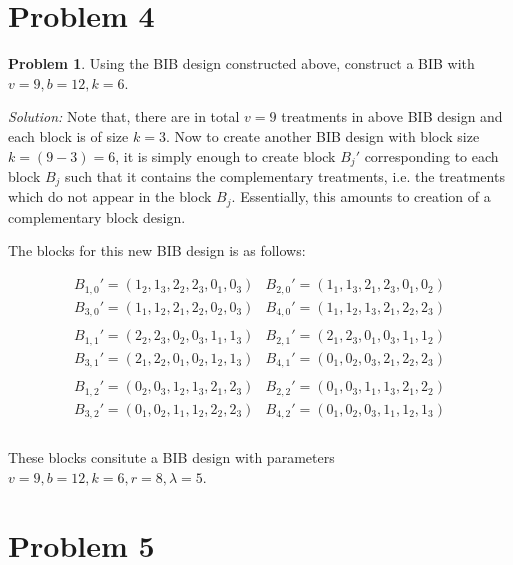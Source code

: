 \documentclass[12pt]{article}
\theoremstyle{definition}
\newtheorem*{prb}{Problem}
\newenvironment{problem}{
\begin{tcolorbox}[colback=blue!5!white,colframe=blue!75!black, parbox = true] \begin{prb}  }{\end{prb}\end{tcolorbox} }
\newenvironment{answer}{\textit{Solution: }\quad }{ \hfill \qedsymbol}
\begin{document}
\section{Problem 4}

\begin{problem}
	Using the BIB design constructed above, construct a BIB with $v = 9, b = 12, k = 6$.
\end{problem}

\begin{answer}
	Note that, there are in total $v = 9$ treatments in above BIB design and each block is of size $k = 3$. Now to create another BIB design with block size $k = (9-3) = 6$, it is simply enough to create block $B_j'$ corresponding to each block $B_j$ such that it contains the complementary treatments, i.e. the treatments which do not appear in the block $B_j$. Essentially, this amounts to creation of a complementary block design.

	The blocks for this new BIB design is as follows:

	$$\begin{array}{llll}
		B_{1,0}' = (1_2, 1_3, 2_2, 2_3, 0_1, 0_3) 
		& B_{2, 0}' = (1_1, 1_3, 2_1, 2_3, 0_1, 0_2)\\
		B_{3,0}' = (1_1, 1_2, 2_1, 2_2, 0_2, 0_3)
		& B_{4, 0}' = (1_1, 1_2, 1_3, 2_1, 2_2, 2_3)\\
		& \\
		B_{1,1}' = (2_2, 2_3, 0_2, 0_3, 1_1, 1_3) 
		& B_{2, 1}' = (2_1, 2_3, 0_1, 0_3, 1_1, 1_2)\\
		B_{3,1}' = (2_1, 2_2, 0_1, 0_2, 1_2, 1_3)
		& B_{4, 1}' = (0_1, 0_2, 0_3, 2_1, 2_2, 2_3)\\
		& \\
		B_{1,2}' = (0_2, 0_3, 1_2, 1_3, 2_1, 2_3) 
		& B_{2, 2}' = (0_1, 0_3, 1_1, 1_3, 2_1, 2_2)\\
		B_{3,2}' = (0_1, 0_2, 1_1, 1_2, 2_2, 2_3)
		& B_{4, 2}' = (0_1, 0_2, 0_3, 1_1, 1_2, 1_3)\\
		& \\
	\end{array}$$

	These blocks consitute a BIB design with parameters $v = 9, b = 12, k = 6, r = 8, \lambda = 5$.

\end{answer}


\section{Problem 5}
\end{document}

